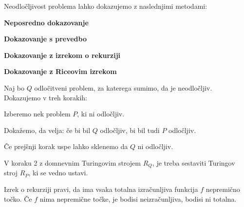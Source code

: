 \documentclass[10pt,a4paper,oneside]{book}
\begin{document}
\begin{neurejeno}
Neodločljivost problema lahko dokazujemo z naslednjimi metodami:
\begin{items}
\item \textbf{Neposredno dokazovanje} %
\item \textbf{Dokazovanje s prevedbo} %
\item \textbf{Dokazovanje z izrekom o rekurziji} %
\item \textbf{Dokazovanje z Riceovim izrekom} %
\end{items}

Naj bo $Q$ odločitveni problem, za katerega sumimo, da je neodločljiv.%
Dokazujemo v treh korakih:
\begin{items}
\item Izberemo nek problem $P$, ki ni odločljiv. %
\item Dokažemo, da velja: če bi bil $Q$ odločljiv, bi bil tudi $P$ odločljiv.
\item Če prejšnji korak uspe lahko sklenemo da $Q$ ni odločljiv. %
\end{items}
V koraku 2 z domnevnim Turingovim strojem $R_Q$, je treba sestaviti Turingov stroj $R_P$, ki se vedno ustavi.

Izrek o rekurziji pravi, da ima vsaka totalna izračunljiva funkcija $f$ nepremično točko. Če $f$ nima nepremične točke, je bodisi neizračunljiva, bodisi ni totalna.



\end{neurejeno}
\end{document}
